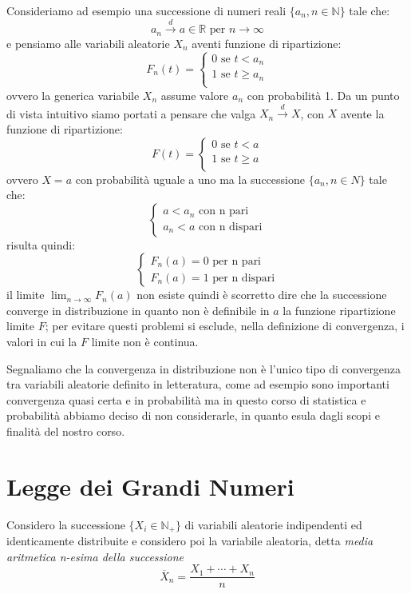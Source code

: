 \documentclass[a4paper,12pt, oneside]{book}
\newcommand{\numberset}{\mathbb}
\newcommand{\N}{\numberset{N}}
\newcommand{\R}{\numberset{R}}
\begin{document}
Consideriamo ad esempio una successione di numeri reali $\{a_n, n \in \N\}$ tale che:
\[a_n \stackrel{d}{\longrightarrow} a \in \R \mbox{ per } n \to \infty\]
e pensiamo alle variabili aleatorie $X_n$ aventi funzione di ripartizione:
\[F_n(t) = \begin{cases}
            0 \mbox{ se } t < a_n\\
            1 \mbox{ se } t \geq a_n\\
           \end{cases}\]
ovvero la generica variabile $X_n$ assume valore $a_n$ con probabilità 1.\newline
Da un punto di vista intuitivo siamo portati a pensare che valga $X_n \stackrel{d}{\longrightarrow} X$,
con $X$ avente la funzione di ripartizione:
\[ F(t) = \begin{cases}
            0 \mbox{ se } t < a\\
            1 \mbox{ se } t \geq a\\
          \end{cases}\]
ovvero $X = a$ con probabilità uguale a uno ma la successione $\{a_n, n \in N\}$ tale che:
\[\begin{cases}
        a<a_n\mbox{ con n pari}\\
        a_n<a\mbox{ con n dispari}
  \end{cases}\]
risulta quindi:
\[\begin{cases}
    F_n(a) = 0 \mbox{ per n pari}\\
    F_n(a) = 1 \mbox{ per n dispari}
\end{cases}\]
il limite $\lim_{n \to \infty} F_n(a)$ non esiste quindi è scorretto dire che la successione converge
in distribuzione in quanto non è definibile in $a$ la funzione ripartizione limite $F$;
per evitare questi problemi si esclude, nella definizione di convergenza, i valori in cui la $F$ limite non è continua.

Segnaliamo che la convergenza in distribuzione non è l'unico tipo di convergenza tra variabili aleatorie
definito in letteratura, come ad esempio sono importanti convergenza quasi certa e in probabilità ma
in questo corso di statistica e probabilità abbiamo deciso di non considerarle, in quanto esula dagli scopi
e finalità del nostro corso.

\section{Legge dei Grandi Numeri}
Considero la successione $\{X_i \in \N_+\}$ di variabili aleatorie indipendenti ed identicamente distribuite e
considero poi la variabile aleatoria, detta \emph{media aritmetica n-esima della successione}
\[ \overline{X}_n = \frac{X_1 + \cdots + X_n}{n}\]
\end{document}
